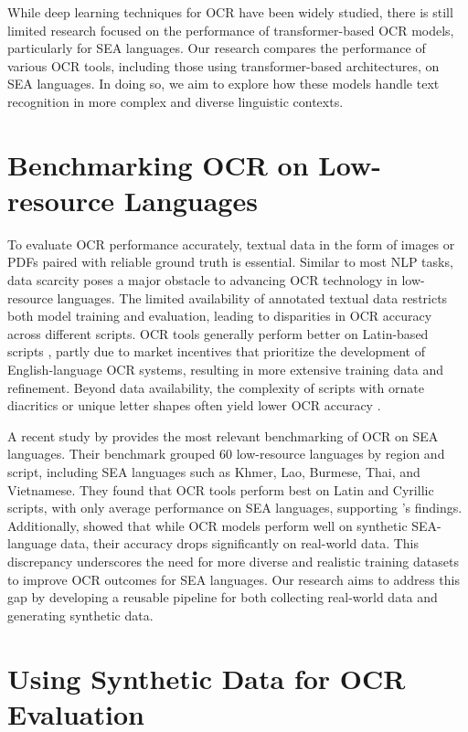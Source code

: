 \documentclass[12pt,oneside]{memoir}
\begin{document}
While deep learning techniques for OCR have been widely studied, there is still limited research focused on the performance of transformer-based OCR models, particularly for SEA languages.
Our research compares the performance of various OCR tools, including those using transformer-based architectures, on SEA languages. 
In doing so, we aim to explore how these models handle text recognition in more complex and diverse linguistic contexts.

\section{Benchmarking OCR on Low-resource Languages}

To evaluate OCR performance accurately, textual data in the form of images or PDFs paired with reliable ground truth is essential. 
Similar to most NLP tasks, data scarcity poses a major obstacle to advancing OCR technology in low-resource languages. The limited availability of annotated textual data restricts both model training and evaluation, leading to disparities in OCR accuracy across different scripts.
OCR tools generally perform better on Latin-based scripts \parencite{hegghammer-2022}, partly due to market incentives that prioritize the development of English-language OCR systems, resulting in more extensive training data and refinement.
Beyond data availability, the complexity of scripts with ornate diacritics or unique letter shapes often yield lower OCR accuracy \parencite{agarwal-and-anastasopoulos-2024}.

A recent study by \textcite{ignat-etal-2022} provides the most relevant benchmarking of OCR on SEA languages.
Their benchmark grouped 60 low-resource languages by region and script, including SEA languages such as Khmer, Lao, Burmese, Thai, and Vietnamese.
They found that OCR tools perform best on Latin and Cyrillic scripts, with only average performance on SEA languages, supporting \textcite{hegghammer-2022}'s findings.
Additionally, \textcite{ignat-etal-2022} showed that while OCR models perform well on synthetic SEA-language data, their accuracy drops significantly on real-world data.
This discrepancy underscores the need for more diverse and realistic training datasets to improve OCR outcomes for SEA languages.
Our research aims to address this gap by developing a reusable pipeline for both collecting real-world data and generating synthetic data.

\section{Using Synthetic Data for OCR Evaluation}
\end{document}
